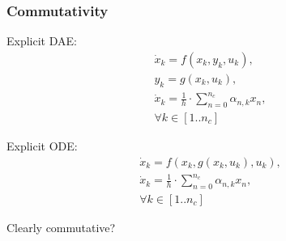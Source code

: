 \documentclass[]{beamer}
\begin{document}
\begin{frame}
\frametitle{Commutativity}
Explicit DAE:
\begin{subequations}
\begin{gather}
\dot x_k = f(x_k, y_k, u_k), \\ 
y_k = g(x_k, u_k), \\
\dot{x}_k = \frac{1}{h} \cdot \sum_{n = 0}^{n_c} \alpha_{n, k} x_n, \\
\forall k \in [1 . . n_c]
\end{gather} 
\end{subequations}

Explicit ODE:
\begin{subequations}
\begin{gather}
\dot x_k = f(x_k, g(x_k, u_k), u_k), \\ 
\dot{x}_k = \frac{1}{h} \cdot \sum_{n = 0}^{n_c} \alpha_{n, k} x_n, \\
\forall k \in [1 . . n_c]
\end{gather} 
\end{subequations}

Clearly commutative?
\end{frame}
\end{document}
